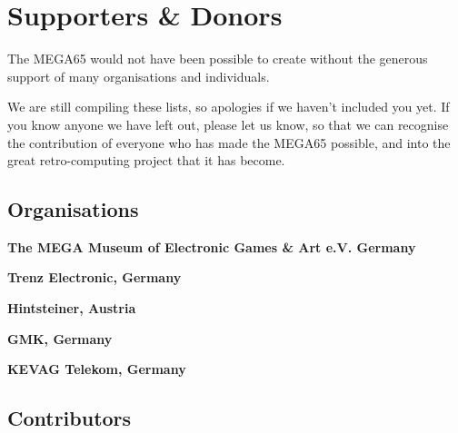 \chapter{Supporters \& Donors}


The MEGA65 would not have been possible to create without the generous support
of many organisations and individuals.

We are still compiling these lists, so apologies if we haven't included you yet.  If you
know anyone we have left out, please let us know, so that we can recognise the contribution
of everyone who has made the MEGA65 possible, and into the great retro-computing project
that it has become.

\section{Organisations}

{\bf The MEGA Museum of Electronic Games \& Art e.V. Germany} \\

{\bf Trenz Electronic, Germany} \\

{\bf Hintsteiner, Austria} \\

{\bf GMK, Germany} \\

{\bf KEVAG Telekom, Germany} \\

\newpage
\section{Contributors}

